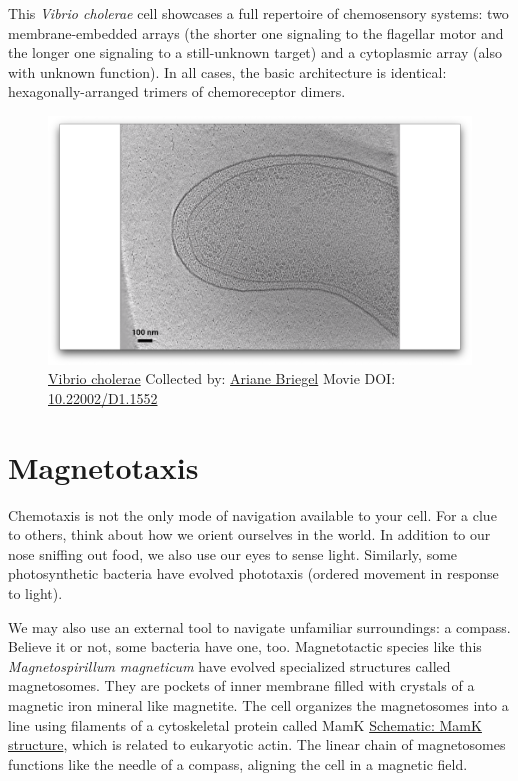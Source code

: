 \documentclass[]{tufte-book}
\begin{document}
This \emph{Vibrio cholerae} cell showcases a full repertoire of
chemosensory systems: two membrane-embedded arrays (the shorter one
signaling to the flagellar motor and the longer one signaling to a
still-unknown target) and a cytoplasmic array (also with unknown
function). In all cases, the basic architecture is identical:
hexagonally-arranged trimers of chemoreceptor dimers.





\begin{figure}
\includegraphics{movie_stills/7_5a} \caption[\protect\hyperlink{tree}{Vibrio cholerae} Collected by:
\protect\hyperlink{ariane_briegel}{Ariane Briegel} Movie DOI:
\href{https://doi.org/10.22002/D1.1552}{10.22002/D1.1552}]{\protect\hyperlink{tree}{Vibrio cholerae} Collected by:
\protect\hyperlink{ariane_briegel}{Ariane Briegel} Movie DOI:
\href{https://doi.org/10.22002/D1.1552}{10.22002/D1.1552}}\label{fig:7-5a}
\end{figure}

\section{Magnetotaxis}\label{magnetotaxis}

Chemotaxis is not the only mode of navigation available to your cell.
For a clue to others, think about how we orient ourselves in the world.
In addition to our nose sniffing out food, we also use our eyes to sense
light. Similarly, some photosynthetic bacteria have evolved phototaxis
(ordered movement in response to light).

We may also use an external tool to navigate unfamiliar surroundings: a
compass. Believe it or not, some bacteria have one, too. Magnetotactic
species like this \emph{Magnetospirillum magneticum} have evolved
specialized structures called magnetosomes. They are pockets of inner
membrane filled with crystals of a magnetic iron mineral like magnetite.
The cell organizes the magnetosomes into a line using filaments of a
cytoskeletal protein called MamK
\protect\hyperlink{MamK_structure}{Schematic: MamK structure}, which is
related to eukaryotic actin. The linear chain of magnetosomes functions
like the needle of a compass, aligning the cell in a magnetic field.
\end{document}
